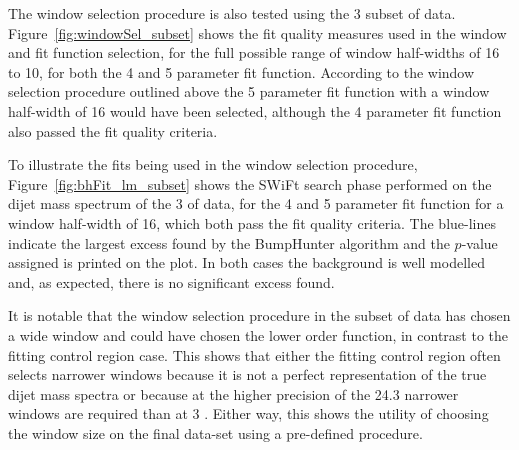 The window selection procedure is also tested using the 3 \ifb{} subset of data.
Figure~\ref{fig:windowSel_subset} shows the fit quality measures used in the window and fit function selection,
for the full possible range of window half-widths of 16 to 10, for both the 4 and 5 parameter fit function.
According to the window selection procedure outlined above the 5 parameter fit function with a window half-width of 16 would have been selected,
although the 4 parameter fit function also passed the fit quality criteria.

To illustrate the fits being used in the window selection procedure,
Figure~\ref{fig:bhFit_lm_subset} shows the SWiFt search phase performed on the dijet mass spectrum of the 3 \ifb{} of data,
for the 4 and 5 parameter fit function for a window half-width of 16, which both pass the fit quality criteria.
The blue-lines indicate the largest excess found by the {\sc BumpHunter} algorithm and the \mbox{$p$-value} assigned is printed on the plot. 
In both cases the background is well modelled and, as expected, there is no significant excess found.

It is notable that the window selection procedure in the subset of data has chosen a wide window and
could have chosen the lower order function, in contrast to the fitting control region case. 
This shows that either the fitting control region often selects narrower windows
because it is not a perfect representation of the true dijet mass spectra
or because at the higher precision of the 24.3 \ifb{} narrower windows are required than at 3 \ifb{}.
Either way, this shows the utility of choosing the window size on the final data-set using a pre-defined procedure.

